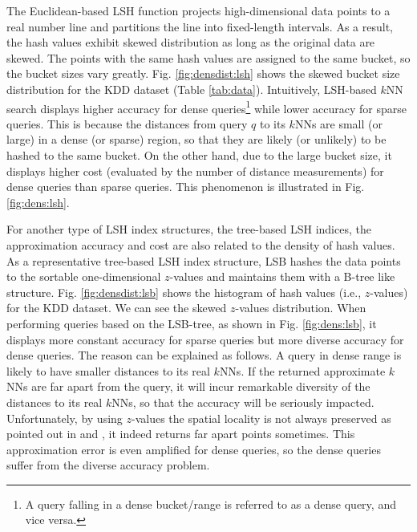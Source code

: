 The Euclidean-based LSH function \cite{datar} projects high-dimensional data points to a real number line and partitions the line into fixed-length intervals. As a result, the hash values exhibit skewed distribution as long as the original data are skewed. The points with the same hash values are assigned to the same bucket, so the bucket sizes vary greatly. Fig. \ref{fig:densdist:lsh} shows the skewed bucket size distribution for the KDD dataset (Table \ref{tab:data}). Intuitively, LSH-based $k$NN search displays higher accuracy for dense queries\footnote{A query falling in a dense bucket/range is referred to as a dense query, and vice versa.} while lower accuracy for sparse queries. This is because the distances from query $q$ to its $k$NNs are small (or large) in a dense (or sparse) region, so that they are likely (or unlikely) to be hashed to the same bucket. On the other hand, due to the large bucket size, it displays higher cost (evaluated by the number of distance measurements) for dense queries than sparse queries. This phenomenon is illustrated in Fig. \ref{fig:dens:lsh}. %

For another type of LSH index structures, the tree-based LSH indices, the approximation accuracy and cost are also related to the density of hash values. As a representative tree-based LSH index structure, LSB \cite{lsb} hashes the data points to the sortable one-dimensional $z$-values and maintains them with a B-tree like structure. Fig. \ref{fig:densdist:lsb} shows the histogram of hash values (i.e., $z$-values) for the KDD dataset. We can see the skewed $z$-values distribution. When performing queries based on the LSB-tree, as shown in Fig. \ref{fig:dens:lsb}, it displays more constant accuracy for sparse queries but more diverse accuracy for dense queries. The reason can be explained as follows. A query in dense range is likely to have smaller distances to its real $k$NNs. If the returned approximate $k$NNs are far apart from the query, it will incur remarkable diversity of the distances to its real $k$NNs, so that the accuracy will be seriously impacted. Unfortunately, by using $z$-values the spatial locality is not always preserved as pointed out in \cite{zorkderknn} and \cite{Zhang:2012:EPK:2247596.2247602}, it indeed returns far apart points sometimes. This approximation error is even amplified for dense queries, so the dense queries suffer from the diverse accuracy problem.


